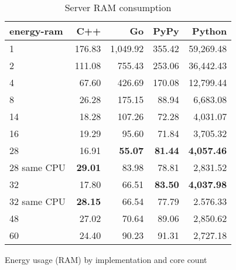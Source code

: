 \begin{table}
    \centering
    \begin{tabular}{lrrrr}
        \hline
        energy-ram   & C++             & Go                & PyPy                & Python            \\
        \hline      
        1            &   176.83        & 1,049.92          &   355.42            &  59,269.48        \\
        2            &   111.08        &   755.43          &   253.06            &  36,442.43        \\
        4            &    67.60        &   426.69          &   170.08            &  12,799.44        \\
        8	           &    26.28 	     &   175.15          &    88.94            &	  6,683.08       \\
        14           &    18.28        &   107.26          &    72.28            &   4,031.07        \\
        16           &    19.29        &    95.60          &    71.84            &   3,705.32        \\
        28           &    16.91        &    \textbf{55.07} &    \textbf{81.44}   & \textbf{4,057.46} \\
        28 same CPU  & \textbf{29.01}  &    83.98          &    78.81            &   2,831.52        \\
        32           &    17.80        &    66.51          &    \textbf{83.50}   & \textbf{4,037.98} \\
        32 same CPU  & \textbf{28.15}  &    66.54          &    77.79            &   2.576.33        \\
        48           &    27.02        &    70.64          &    89.06            &   2,850.62        \\
        60           &    24.40        &    90.23          &    91.31            &   2,727.18        \\
        \hline
    \end{tabular}
    \caption{Server RAM consumption}{Energy usage (RAM) by implementation and core count}
    \label{tab:server-energy-ram}
\end{table}